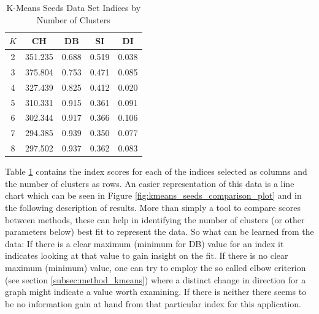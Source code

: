 \begin{table}[H]
\begin{center}
\begin{tabular}{crrrr}
$K$ & \multicolumn{1}{c}{\gls{CH}} & \multicolumn{1}{c}{\gls{DB}} & \multicolumn{1}{c}{\gls{SI}} & \multicolumn{1}{c}{\gls{DI}} \\ \hline
2 & 351.235 & 0.688 & 0.519 & 0.038 \\
3 & 375.804 & 0.753 & 0.471 & 0.085 \\
4 & 327.439 & 0.825 & 0.412 & 0.020 \\
5 & 310.331 & 0.915 & 0.361 & 0.091 \\
6 & 302.344 & 0.917 & 0.366 & 0.106 \\
7 & 294.385 & 0.939 & 0.350 & 0.077 \\
8 & 297.502 & 0.937 & 0.362 & 0.083 \\
\end{tabular}%
\end{center}
\caption{K-Means Seeds Data Set Indices by Number of Clusters}
\label{tab:kmeans_seeds_table}
\end{table}

Table \ref{tab:kmeans_seeds_table} contains the index scores for each of the indices selected as columns and the number of clusters as rows. An easier representation of this data is a line chart which can be seen in Figure \ref{fig:kmeans_seeds_comparison_plot} and in the following description of results. More than simply a tool to compare scores between methods, these can help in identifying the number of clusters (or other parameters below) best fit to represent the data. So what can be learned from the data: If there is a clear maximum (minimum for \gls{DB}) value for an index it indicates looking at that value to gain insight on the fit. If there is no clear maximum (minimum) value, one can try to employ the so called elbow criterion (see section \ref{subsec:method_kmeans}) where a distinct change in direction for a graph might indicate a value worth examining. If there is neither there seems to be no information gain at hand from that particular index for this application.

